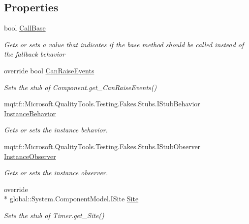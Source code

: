 \subsection*{Properties}
\begin{DoxyCompactItemize}
\item 
bool \hyperlink{class_system_1_1_timers_1_1_fakes_1_1_stub_timer_ab78aaeab87ab00b50fb8eeaf71ba98c0}{Call\-Base}
\begin{DoxyCompactList}\small\item\em Gets or sets a value that indicates if the base method should be called instead of the fallback behavior\end{DoxyCompactList}\item 
override bool \hyperlink{class_system_1_1_timers_1_1_fakes_1_1_stub_timer_ab6de0bcb7d73796563dbaa3499985e84}{Can\-Raise\-Events}
\begin{DoxyCompactList}\small\item\em Sets the stub of Component.\-get\-\_\-\-Can\-Raise\-Events()\end{DoxyCompactList}\item 
mqttf\-::\-Microsoft.\-Quality\-Tools.\-Testing.\-Fakes.\-Stubs.\-I\-Stub\-Behavior \hyperlink{class_system_1_1_timers_1_1_fakes_1_1_stub_timer_aa0280bfddcd69f02ad83ce9e94caa520}{Instance\-Behavior}
\begin{DoxyCompactList}\small\item\em Gets or sets the instance behavior.\end{DoxyCompactList}\item 
mqttf\-::\-Microsoft.\-Quality\-Tools.\-Testing.\-Fakes.\-Stubs.\-I\-Stub\-Observer \hyperlink{class_system_1_1_timers_1_1_fakes_1_1_stub_timer_a1ed0b66c8c450396b1cceabea3e0fb84}{Instance\-Observer}
\begin{DoxyCompactList}\small\item\em Gets or sets the instance observer.\end{DoxyCompactList}\item 
override \\*
global\-::\-System.\-Component\-Model.\-I\-Site \hyperlink{class_system_1_1_timers_1_1_fakes_1_1_stub_timer_a4cccf4f3aba8efcf73f470b0b8a76da0}{Site}
\begin{DoxyCompactList}\small\item\em Sets the stub of Timer.\-get\-\_\-\-Site()\end{DoxyCompactList}\end{DoxyCompactItemize}


